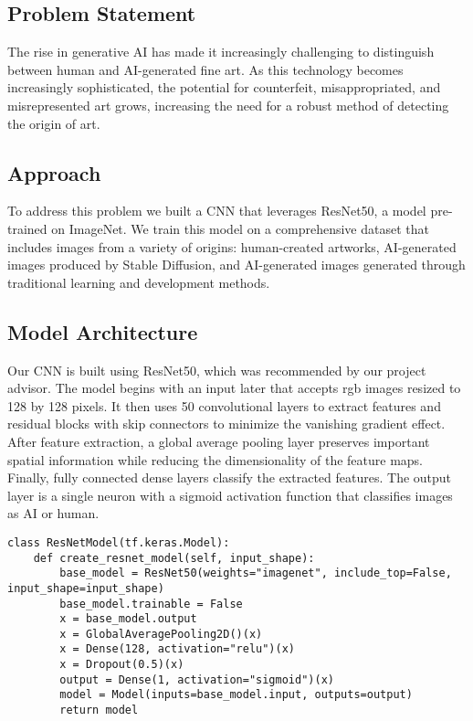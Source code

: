 \subsection{Problem Statement}
\par The rise in generative AI has made it increasingly challenging to distinguish between human and AI-generated fine art. As this technology becomes increasingly sophisticated, the potential for counterfeit, misappropriated, and misrepresented art grows, increasing the need for a robust method of detecting the origin of art.

\subsection{Approach}
\par To address this problem we built a CNN that leverages ResNet50, a model pre-trained on ImageNet. We train this model on a comprehensive dataset that includes images from a variety of origins: human-created artworks, AI-generated images produced by Stable Diffusion, and AI-generated images generated through traditional learning and development methods.

\subsection{Model Architecture}
\par Our CNN is built using ResNet50, which was recommended by our project advisor. The model begins with an input later that accepts rgb images resized to 128 by 128 pixels. It then uses 50 convolutional layers to extract features and residual blocks with skip connectors to minimize the vanishing gradient effect. After feature extraction, a global average pooling layer preserves important spatial information while reducing the dimensionality of the feature maps. Finally, fully connected dense layers classify the extracted features. The output layer is a single neuron with a sigmoid activation function that classifies images as AI or human.

\begin{lstlisting}[style=Matlab-editor]
class ResNetModel(tf.keras.Model):
    def create_resnet_model(self, input_shape):
        base_model = ResNet50(weights="imagenet", include_top=False, input_shape=input_shape)
        base_model.trainable = False
        x = base_model.output
        x = GlobalAveragePooling2D()(x)
        x = Dense(128, activation="relu")(x)
        x = Dropout(0.5)(x)
        output = Dense(1, activation="sigmoid")(x)  
        model = Model(inputs=base_model.input, outputs=output)
        return model
\end{lstlisting}

